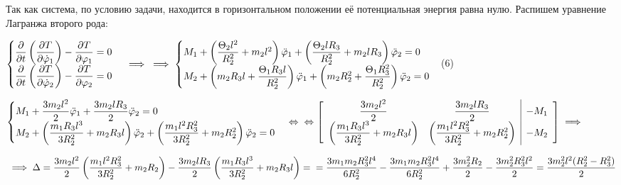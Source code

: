\documentclass[a4paper, 12pt]{article}
\begin{document}
	\quad Так как система, по условию задачи, находится в горизонтальном положении её потенциальная энергия равна нулю. Распишем уравнение Лагранжа второго рода:
	
	\begin{center}
		$\begin{cases}
			\dfrac{\partial }{\partial t} \left( \dfrac{\partial T}{\partial \dot\varphi_1 }\right)  - \dfrac{\partial T}{\partial \varphi_1} = 0 \\
			\dfrac{\partial }{\partial t} \left( \dfrac{\partial T}{\partial \dot\varphi_2 }\right)  - \dfrac{\partial T}{\partial \varphi_2} = 0
		\end{cases} \implies \newline \implies 
		\begin{cases}
			M_1 + \left( \dfrac{\Theta_2 l^2}{R_2 ^2} + m_2 l^2 \right) \ddot \varphi_1 + \left( \dfrac{\Theta_2 l R_3}{R_2 ^2} + m_2 l R_3 \right)  \ddot\varphi_2 = 0\\
			M_2 + \left( m_2 R_3 l  + \dfrac{\Theta_1 R_3 l}{R_2 ^2}\right) \ddot\varphi_1 + \left( m_2 R_2 ^2 + \dfrac{\Theta_1 R_3 ^2}{R_2 ^2} \right) \ddot\varphi_2 = 0
		\end{cases}$(6)
		
		$ 
		\begin{cases}
			M_1 + \dfrac{3m_2 l^2}{2} \ddot\varphi_1 + \dfrac{3 m_2 l R_3}{2} \ddot\varphi_2 = 0 \\
			M_2 + \left( \dfrac{m_1 R_3 l^3}{3 R_2 ^2} + m_2 R_3 l \right) \ddot\varphi_2 + \left( \dfrac{m_1 l^2 R_3 ^2 }{3 R_2 ^2} + m_2 R_2 ^2 \right) \ddot\varphi_2 = 0
		\end{cases} \Leftrightarrow \newline
		\Leftrightarrow \left[
		\begin{array} {cc|c}
			\dfrac{3 m_2 l^2}{2}& \dfrac{3 m_2 l R_3}{2}& - M_1 \\
			\left(\dfrac{m_1 R_3 l^3}{3 R_2 ^2} + m_2 R_3 l \right) & \left( \dfrac{m_1 l^2 R_3^2 }{3R_2 ^2} + m_2 R_2 ^2 \right) & -M_2
		\end{array}
		\right] \implies 
		$
		
		$ \newline \implies \Delta = \dfrac{3 m_2 l^2}{2} \left( \dfrac{m_1 l^2 R_3 ^2}{3 R_2 ^2} + m_2 R_2 \right) - \dfrac{ 3m_2 l R_3}{2} \left( \dfrac{m_1 R_3 l^3}{3 R_2 ^2} + m_2 R_3 l \right) = \newline = \dfrac{3 m_1 m_2 R_3 ^2 l^4 }{6 R_2 ^2} - \dfrac{3 m_1 m_2 R_3 ^2 l^4}{6 R_2 ^2} + \dfrac{3 m_2 ^2 R_2}{2} - \dfrac{3 m_2 ^2 R_3 ^2 l^2}{2} = \dfrac{3 m_2^2 l^2 (R_2 ^2 - R_3 ^2)}{2}$
		

\end{center}
\end{document}
